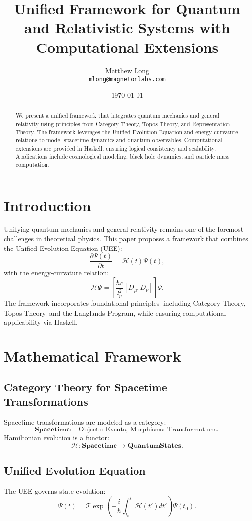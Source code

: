 \documentclass[a4paper,11pt]{article}
\title{Unified Framework for Quantum and Relativistic Systems with Computational Extensions}
\author{Matthew Long \\ \texttt{mlong@magnetonlabs.com}}
\date{\today}
\begin{document}
\maketitle

\begin{abstract}
We present a unified framework that integrates quantum mechanics and general relativity using principles from Category Theory, Topos Theory, and Representation Theory. The framework leverages the Unified Evolution Equation and energy-curvature relations to model spacetime dynamics and quantum observables. Computational extensions are provided in Haskell, ensuring logical consistency and scalability. Applications include cosmological modeling, black hole dynamics, and particle mass computation.
\end{abstract}

\section{Introduction}
Unifying quantum mechanics and general relativity remains one of the foremost challenges in theoretical physics. This paper proposes a framework that combines the Unified Evolution Equation (UEE):
\[
\frac{\partial \Psi(t)}{\partial t} = \mathcal{H}(t) \Psi(t),
\]
with the energy-curvature relation:
\[
\mathcal{H} \Psi = \left[\frac{\hbar c}{l_p^2} [D_\mu, D_\nu] \right] \Psi.
\]
The framework incorporates foundational principles, including Category Theory, Topos Theory, and the Langlands Program, while ensuring computational applicability via Haskell.

\section{Mathematical Framework}
\subsection{Category Theory for Spacetime Transformations}
Spacetime transformations are modeled as a category:
\[
\textbf{Spacetime}: \quad \text{Objects: Events, Morphisms: Transformations.}
\]
Hamiltonian evolution is a functor:
\[
\mathcal{H}: \textbf{Spacetime} \to \textbf{QuantumStates}.
\]

\subsection{Unified Evolution Equation}
The UEE governs state evolution:
\[
\Psi(t) = \mathcal{T} \exp \left( -\frac{i}{\hbar} \int_{t_0}^t \mathcal{H}(t') dt' \right) \Psi(t_0).
\]
\end{document}
